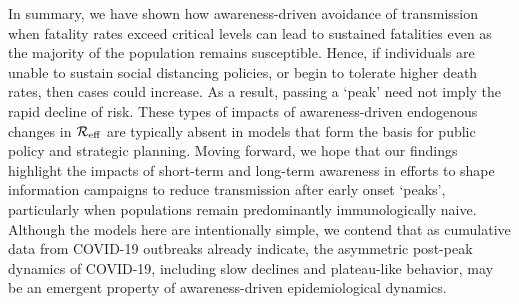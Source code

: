 In summary, we have shown how awareness-driven avoidance of transmission
when fatality rates exceed critical levels can lead
to sustained fatalities
even as the majority
of the population remains
susceptible. 
Hence, if individuals are unable
to sustain social
distancing policies, or begin to tolerate higher death rates, then cases 
could increase. 
As a result, passing a `peak' need not imply
the rapid decline of risk.  These types of impacts of awareness-driven
endogenous changes in ${\cal{R}}_{\mathrm{eff}}$ are typically
absent in models that form the basis for public policy and strategic planning.
Moving forward, we hope that our findings
highlight the impacts of short-term and long-term awareness 
in efforts to shape information campaigns
to reduce transmission after early onset `peaks', particularly
when populations remain predominantly immunologically naive.
Although the models here are intentionally simple,
we contend that as cumulative data from COVID-19 outbreaks already
indicate, the asymmetric post-peak dynamics of COVID-19, including
slow declines and plateau-like behavior, may be an emergent
property of awareness-driven epidemiological dynamics.

